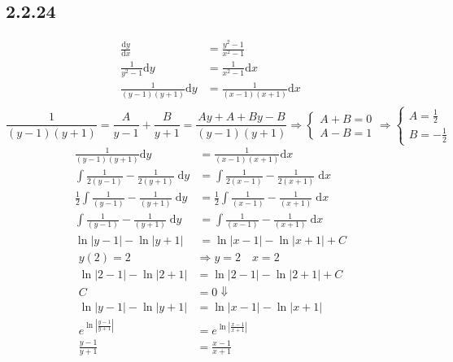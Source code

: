 \documentclass{article}
\begin{document}
\subsection{2.2.24}
\begin{align*}
    \frac{\mathrm{d}y}{\mathrm{d}x} &= \frac{y^2-1}{x^2-1}\\
    \frac{1}{y^2-1}\mathrm{d}y &= \frac{1}{x^2-1}\mathrm{d}x\\
    \frac{1}{(y-1)(y+1)}\mathrm{d}y &= \frac{1}{(x-1)(x+1)}\mathrm{d}x\\
\end{align*}
\[
    \frac{1}{(y-1)(y+1)} = \frac{A}{y-1}+\frac{B}{y+1} = \frac{Ay+A+By-B}{(y-1)(y+1)} \Rightarrow  \begin{cases}A+B=0 \\ A-B=1 \end{cases} \Rightarrow \begin{cases}A=\frac{1}{2} \\ B=-\frac{1}{2} \end{cases}
\]
\begin{align*}
    \frac{1}{(y-1)(y+1)}\mathrm{d}y &= \frac{1}{(x-1)(x+1)}\mathrm{d}x\\
    \int \frac{1}{2(y-1)}-\frac{1}{2(y+1)} \; \mathrm{d}y &= \int \frac{1}{2(x-1)}-\frac{1}{2(x+1)} \; \mathrm{d}x \\
    \frac{1}{2}\int \frac{1}{(y-1)}-\frac{1}{(y+1)} \; \mathrm{d}y &=\frac{1}{2} \int \frac{1}{(x-1)}-\frac{1}{(x+1)} \; \mathrm{d}x \\
    \int \frac{1}{(y-1)}-\frac{1}{(y+1)} \; \mathrm{d}y &=\int \frac{1}{(x-1)}-\frac{1}{(x+1)} \; \mathrm{d}x \\
    \ln |y-1| - \ln |y+1|  &=  \ln |x-1| - \ln |x+1| +C
\end{align*}
\begin{align*}
    y(2) =2 &\Rightarrow y=2 \quad x  = 2  \\
\ln |2-1| - \ln |2+1|  &=  \ln |2-1| - \ln |2+1| +C \\
C &= 0 \Downarrow \\
    \ln |y-1| - \ln |y+1|  &=  \ln |x-1| - \ln |x+1| \\
   e^{ \ln \left|\frac{y-1}{y+1}\right|}&= e^{ \ln \left|\frac{x-1}{x+1}\right|} \\
\frac{y-1}{y+1} &= \frac{x-1}{x+1}
\end{align*}
\end{document}
